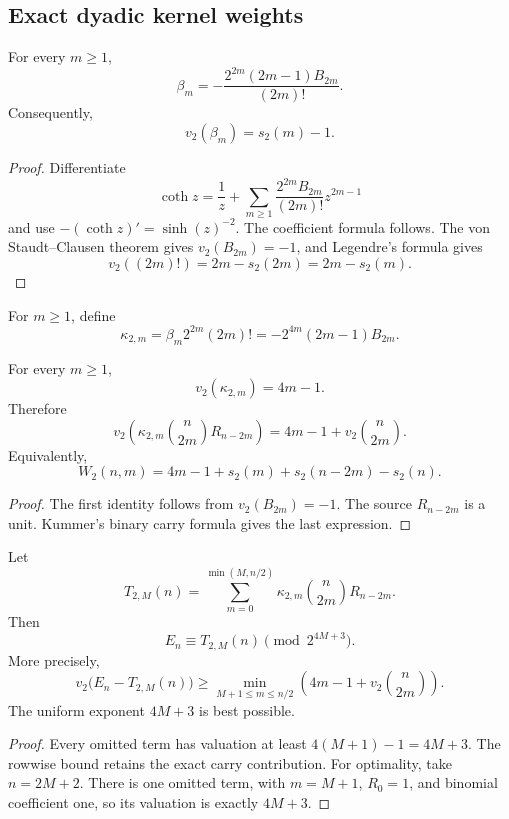 \subsection{Exact dyadic kernel weights}
\begin{lemma}
For every $m\geq1$,
\[
 \boxed{\beta_m=-\frac{2^{2m}(2m-1)B_{2m}}{(2m)!}.}
\]
Consequently,
\[
 \boxed{v_2(\beta_m)=s_2(m)-1.}
\]
\end{lemma}

\begin{proof}
Differentiate
\[
 \coth z=\frac1z+\sum_{m\geq1}\frac{2^{2m}B_{2m}}{(2m)!}z^{2m-1}
\]
and use $-(\coth z)'=\sinh(z)^{-2}$. The coefficient formula follows. The von Staudt--Clausen theorem gives $v_2(B_{2m})=-1$, and Legendre's formula gives
\[
 v_2((2m)!)=2m-s_2(2m)=2m-s_2(m).
\]
\end{proof}

For $m\geq1$, define
\[
 \boxed{\kappa_{2,m}=\beta_m2^{2m}(2m)!=-2^{4m}(2m-1)B_{2m}.}
\]

\begin{theorem}
For every $m\geq1$,
\[
 \boxed{v_2(\kappa_{2,m})=4m-1.}
\]
Therefore
\[
 \boxed{v_2\left(\kappa_{2,m}\binom n{2m}R_{n-2m}\right)=4m-1+v_2\binom n{2m}.}
\]
Equivalently,
\[
 \boxed{W_2(n,m)=4m-1+s_2(m)+s_2(n-2m)-s_2(n).}
\]
\end{theorem}

\begin{proof}
The first identity follows from $v_2(B_{2m})=-1$. The source $R_{n-2m}$ is a unit. Kummer's binary carry formula gives the last expression.
\end{proof}

\begin{theorem}
Let
\[
 T_{2,M}(n)=\sum_{m=0}^{\min(M,n/2)}\kappa_{2,m}\binom n{2m}R_{n-2m}.
\]
Then
\[
 \boxed{E_n\equiv T_{2,M}(n)\pmod{2^{4M+3}}.}
\]
More precisely,
\[
 \boxed{v_2\bigl(E_n-T_{2,M}(n)\bigr)\geq\min_{M+1\leq m\leq n/2}\left(4m-1+v_2\binom n{2m}\right).}
\]
The uniform exponent $4M+3$ is best possible.
\end{theorem}

\begin{proof}
Every omitted term has valuation at least $4(M+1)-1=4M+3$. The rowwise bound retains the exact carry contribution. For optimality, take $n=2M+2$. There is one omitted term, with $m=M+1$, $R_0=1$, and binomial coefficient one, so its valuation is exactly $4M+3$.
\end{proof}

